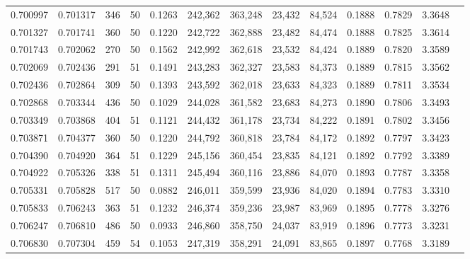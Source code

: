 \begin{tabular}{rrrrrrrrrrrrr}
0.700997 & 0.701317 &   346 &  50 &                                     0.1263 & 242,362 & 363,248 &  23,432 &  84,524 & 0.1888 & 0.7829 & 3.3648 \\
0.701327 & 0.701741 &   360 &  50 &                                     0.1220 & 242,722 & 362,888 &  23,482 &  84,474 & 0.1888 & 0.7825 & 3.3614 \\
0.701743 & 0.702062 &   270 &  50 &                                     0.1562 & 242,992 & 362,618 &  23,532 &  84,424 & 0.1889 & 0.7820 & 3.3589 \\
0.702069 & 0.702436 &   291 &  51 &                                     0.1491 & 243,283 & 362,327 &  23,583 &  84,373 & 0.1889 & 0.7815 & 3.3562 \\
0.702436 & 0.702864 &   309 &  50 &                                     0.1393 & 243,592 & 362,018 &  23,633 &  84,323 & 0.1889 & 0.7811 & 3.3534 \\
0.702868 & 0.703344 &   436 &  50 &                                     0.1029 & 244,028 & 361,582 &  23,683 &  84,273 & 0.1890 & 0.7806 & 3.3493 \\
0.703349 & 0.703868 &   404 &  51 &                                     0.1121 & 244,432 & 361,178 &  23,734 &  84,222 & 0.1891 & 0.7802 & 3.3456 \\
0.703871 & 0.704377 &   360 &  50 &                                     0.1220 & 244,792 & 360,818 &  23,784 &  84,172 & 0.1892 & 0.7797 & 3.3423 \\
0.704390 & 0.704920 &   364 &  51 &                                     0.1229 & 245,156 & 360,454 &  23,835 &  84,121 & 0.1892 & 0.7792 & 3.3389 \\
0.704922 & 0.705326 &   338 &  51 &                                     0.1311 & 245,494 & 360,116 &  23,886 &  84,070 & 0.1893 & 0.7787 & 3.3358 \\
0.705331 & 0.705828 &   517 &  50 &                                     0.0882 & 246,011 & 359,599 &  23,936 &  84,020 & 0.1894 & 0.7783 & 3.3310 \\
0.705833 & 0.706243 &   363 &  51 &                                     0.1232 & 246,374 & 359,236 &  23,987 &  83,969 & 0.1895 & 0.7778 & 3.3276 \\
0.706247 & 0.706810 &   486 &  50 &                                     0.0933 & 246,860 & 358,750 &  24,037 &  83,919 & 0.1896 & 0.7773 & 3.3231 \\
0.706830 & 0.707304 &   459 &  54 &                                     0.1053 & 247,319 & 358,291 &  24,091 &  83,865 & 0.1897 & 0.7768 & 3.3189 \\

\end{tabular}
